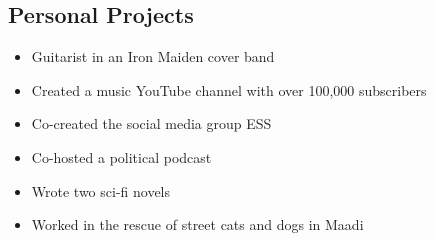 \documentclass[10pt, letterpaper]{article}
\begin{document}
\begin{mdframed}[style=cvframe]
\begin{multicols}{2}
\section{Personal Projects}
\begin{itemize}[leftmargin=*]
    \item Guitarist in an Iron Maiden cover band
    \item Created a music YouTube channel with over 100,000 subscribers
    \item Co-created the social media group ESS
    \item Co-hosted a political podcast
    \item Wrote two sci-fi novels
    \item Worked in the rescue of street cats and dogs in Maadi
\end{itemize}

\end{multicols}
\end{mdframed}
\end{document}
